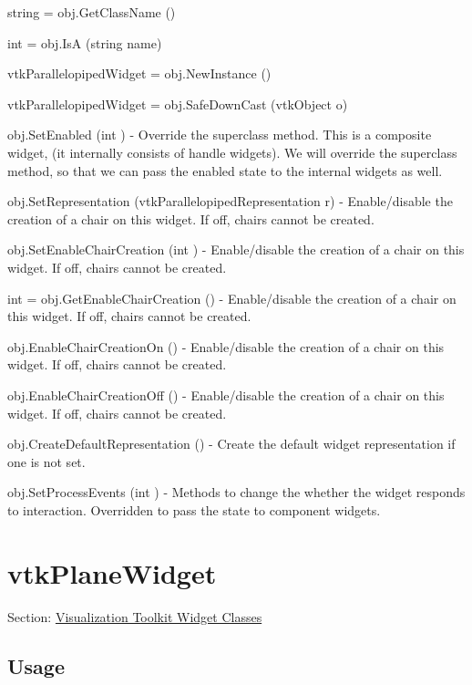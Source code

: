 \begin{DoxyItemize}
\item {\ttfamily string = obj.\-Get\-Class\-Name ()}  
\item {\ttfamily int = obj.\-Is\-A (string name)}  
\item {\ttfamily vtk\-Parallelopiped\-Widget = obj.\-New\-Instance ()}  
\item {\ttfamily vtk\-Parallelopiped\-Widget = obj.\-Safe\-Down\-Cast (vtk\-Object o)}  
\item {\ttfamily obj.\-Set\-Enabled (int )} -\/ Override the superclass method. This is a composite widget, (it internally consists of handle widgets). We will override the superclass method, so that we can pass the enabled state to the internal widgets as well.  
\item {\ttfamily obj.\-Set\-Representation (vtk\-Parallelopiped\-Representation r)} -\/ Enable/disable the creation of a chair on this widget. If off, chairs cannot be created.  
\item {\ttfamily obj.\-Set\-Enable\-Chair\-Creation (int )} -\/ Enable/disable the creation of a chair on this widget. If off, chairs cannot be created.  
\item {\ttfamily int = obj.\-Get\-Enable\-Chair\-Creation ()} -\/ Enable/disable the creation of a chair on this widget. If off, chairs cannot be created.  
\item {\ttfamily obj.\-Enable\-Chair\-Creation\-On ()} -\/ Enable/disable the creation of a chair on this widget. If off, chairs cannot be created.  
\item {\ttfamily obj.\-Enable\-Chair\-Creation\-Off ()} -\/ Enable/disable the creation of a chair on this widget. If off, chairs cannot be created.  
\item {\ttfamily obj.\-Create\-Default\-Representation ()} -\/ Create the default widget representation if one is not set.  
\item {\ttfamily obj.\-Set\-Process\-Events (int )} -\/ Methods to change the whether the widget responds to interaction. Overridden to pass the state to component widgets.  
\end{DoxyItemize}\hypertarget{vtkwidgets_vtkplanewidget}{}\section{vtk\-Plane\-Widget}\label{vtkwidgets_vtkplanewidget}
Section\-: \hyperlink{sec_vtkwidgets}{Visualization Toolkit Widget Classes} \hypertarget{vtkwidgets_vtkxyplotwidget_Usage}{}\subsection{Usage}\label{vtkwidgets_vtkxyplotwidget_Usage}
